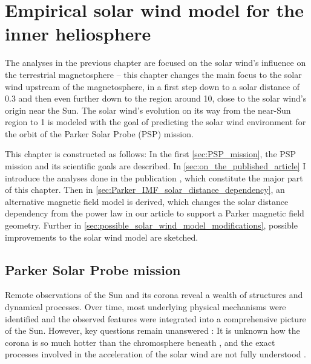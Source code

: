 
\chapter{Empirical solar wind model for the inner heliosphere}
\label{chap:chapterPSP}

The analyses in the previous chapter are focused on the solar wind's influence on the terrestrial magnetosphere -- this chapter changes the main focus to the solar wind upstream of the magnetosphere, in a first step down to a solar distance of \SI{0.3}{\au} and then even further down to the region around \SI{10}{\Rs}, close to the solar wind's origin near the Sun. The solar wind's evolution on its way from the near-Sun region to \SI{1}{\au} is modeled with the goal of predicting the solar wind environment for the orbit of the Parker Solar Probe (PSP) mission.


This chapter is constructed as follows: In the first \autoref{sec:PSP_mission}, the PSP mission and its scientific goals are described. In \autoref{sec:on_the_published_article} I introduce the analyses done in the publication \citet{Venzmer2018}, which constitute the major part of this chapter. Then in \autoref{sec:Parker_IMF_solar_distance_dependency}, an alternative magnetic field model is derived, which changes the solar distance dependency from the power law in our article to support a Parker magnetic field geometry. Further in \autoref{sec:possible_solar_wind_model_modifications}, possible improvements to the solar wind model are sketched.


\section{Parker Solar Probe mission}
\label{sec:PSP_mission}
Remote observations of the Sun and its corona reveal a wealth of structures and dynamical processes. Over time, most underlying physical mechanisms were identified and the observed features were integrated into a comprehensive picture of the Sun. However, key questions remain unanswered \citep{McComas2007}: It is unknown how the corona is so much hotter than the chromosphere beneath \citep{Klimchuk2006}, and the exact processes involved in the acceleration of the solar wind are not fully understood \citep{Hollweg1985,Cranmer2017}.

